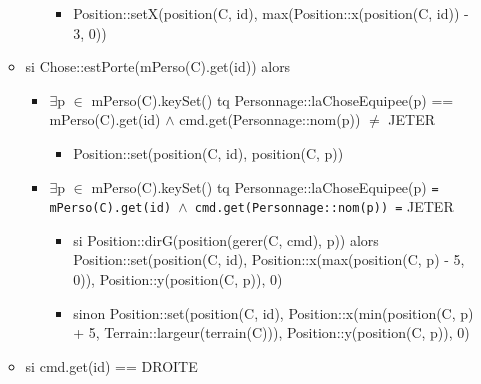 \documentclass[11pt]{article}
\begin{document}
\begin{itemize}
\begin{itemize}
\begin{itemize}
\begin{itemize}
\item Position::setX(position(C, id), max(Position::x(position(C, id)) - 3, 0))\\
\label{sec-1.7.3.6.1.2.1}


\end{itemize} %
\end{itemize} %

\item si Chose::estPorte(mPerso(C).get(id)) alors\\
\label{sec-1.7.3.6.2}

\begin{itemize}

\item $\exists$p $\in$ mPerso(C).keySet() tq Personnage::laChoseEquipee(p) == mPerso(C).get(id) $\wedge$ cmd.get(Personnage::nom(p)) $\neq$ JETER\\
\label{sec-1.7.3.6.2.1}

\begin{itemize}

\item Position::set(position(C, id), position(C, p))\\
\label{sec-1.7.3.6.2.1.1}

\end{itemize} %

\item $\exists$p $\in$ mPerso(C).keySet() tq Personnage::laChoseEquipee(p) \texttt{= mPerso(C).get(id) $\wedge$ cmd.get(Personnage::nom(p)) =} JETER\\
\label{sec-1.7.3.6.2.2}

\begin{itemize}

\item si Position::dirG(position(gerer(C, cmd), p)) alors Position::set(position(C, id), Position::x(max(position(C, p) - 5, 0)), Position::y(position(C, p)), 0)\\
\label{sec-1.7.3.6.2.2.1}


\item sinon Position::set(position(C, id), Position::x(min(position(C, p) + 5, Terrain::largeur(terrain(C))), Position::y(position(C, p)), 0)\\
\label{sec-1.7.3.6.2.2.2}


\end{itemize} %
\end{itemize} %

\item si cmd.get(id) == DROITE\\
\label{sec-1.7.3.6.3}


\end{itemize}
\end{itemize}
\end{document}
